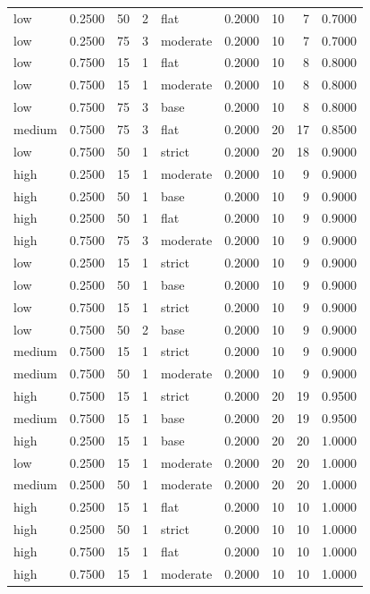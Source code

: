 \begin{tabular}{lrrrlrrrr}
low & 0.2500 & 50 & 2 & flat & 0.2000 & 10 & 7 & 0.7000 \\
low & 0.2500 & 75 & 3 & moderate & 0.2000 & 10 & 7 & 0.7000 \\
low & 0.7500 & 15 & 1 & flat & 0.2000 & 10 & 8 & 0.8000 \\
low & 0.7500 & 15 & 1 & moderate & 0.2000 & 10 & 8 & 0.8000 \\
low & 0.7500 & 75 & 3 & base & 0.2000 & 10 & 8 & 0.8000 \\
medium & 0.7500 & 75 & 3 & flat & 0.2000 & 20 & 17 & 0.8500 \\
low & 0.7500 & 50 & 1 & strict & 0.2000 & 20 & 18 & 0.9000 \\
high & 0.2500 & 15 & 1 & moderate & 0.2000 & 10 & 9 & 0.9000 \\
high & 0.2500 & 50 & 1 & base & 0.2000 & 10 & 9 & 0.9000 \\
high & 0.2500 & 50 & 1 & flat & 0.2000 & 10 & 9 & 0.9000 \\
high & 0.7500 & 75 & 3 & moderate & 0.2000 & 10 & 9 & 0.9000 \\
low & 0.2500 & 15 & 1 & strict & 0.2000 & 10 & 9 & 0.9000 \\
low & 0.2500 & 50 & 1 & base & 0.2000 & 10 & 9 & 0.9000 \\
low & 0.7500 & 15 & 1 & strict & 0.2000 & 10 & 9 & 0.9000 \\
low & 0.7500 & 50 & 2 & base & 0.2000 & 10 & 9 & 0.9000 \\
medium & 0.7500 & 15 & 1 & strict & 0.2000 & 10 & 9 & 0.9000 \\
medium & 0.7500 & 50 & 1 & moderate & 0.2000 & 10 & 9 & 0.9000 \\
high & 0.7500 & 15 & 1 & strict & 0.2000 & 20 & 19 & 0.9500 \\
medium & 0.7500 & 15 & 1 & base & 0.2000 & 20 & 19 & 0.9500 \\
high & 0.2500 & 15 & 1 & base & 0.2000 & 20 & 20 & 1.0000 \\
low & 0.2500 & 15 & 1 & moderate & 0.2000 & 20 & 20 & 1.0000 \\
medium & 0.2500 & 50 & 1 & moderate & 0.2000 & 20 & 20 & 1.0000 \\
high & 0.2500 & 15 & 1 & flat & 0.2000 & 10 & 10 & 1.0000 \\
high & 0.2500 & 50 & 1 & strict & 0.2000 & 10 & 10 & 1.0000 \\
high & 0.7500 & 15 & 1 & flat & 0.2000 & 10 & 10 & 1.0000 \\
high & 0.7500 & 15 & 1 & moderate & 0.2000 & 10 & 10 & 1.0000 \\

\end{tabular}
